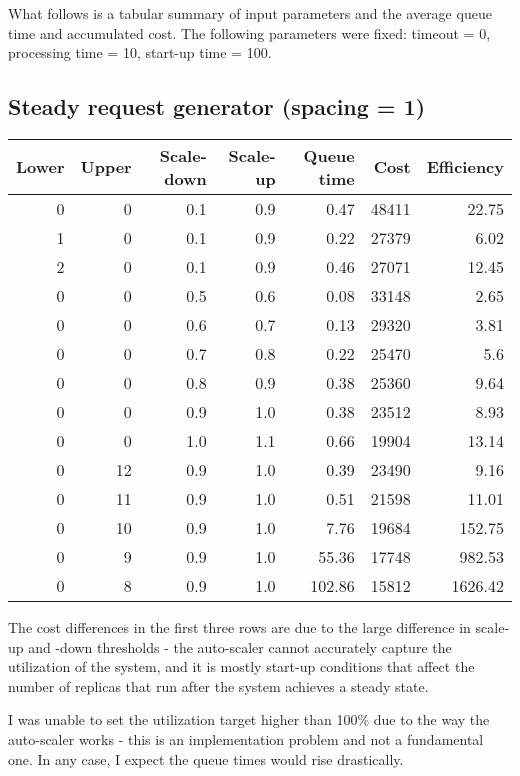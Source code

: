 \documentclass{scrartcl}
\begin{document}
What follows is a tabular summary of input parameters and the average queue time
and accumulated cost. The following parameters were fixed: timeout = 0,
processing time = 10, start-up time = 100.

\subsection{Steady request generator (spacing = 1)}
\label{sec-5-1}
\begin{center}
\begin{tabular}{rrrrrrr}
Lower & Upper & Scale-down & Scale-up & Queue time & Cost & Efficiency\\
\hline
0 & 0 & 0.1 & 0.9 & 0.47 & 48411 & 22.75\\
1 & 0 & 0.1 & 0.9 & 0.22 & 27379 & 6.02\\
2 & 0 & 0.1 & 0.9 & 0.46 & 27071 & 12.45\\
0 & 0 & 0.5 & 0.6 & 0.08 & 33148 & 2.65\\
0 & 0 & 0.6 & 0.7 & 0.13 & 29320 & 3.81\\
0 & 0 & 0.7 & 0.8 & 0.22 & 25470 & 5.6\\
0 & 0 & 0.8 & 0.9 & 0.38 & 25360 & 9.64\\
0 & 0 & 0.9 & 1.0 & 0.38 & 23512 & 8.93\\
0 & 0 & 1.0 & 1.1 & 0.66 & 19904 & 13.14\\
0 & 12 & 0.9 & 1.0 & 0.39 & 23490 & 9.16\\
0 & 11 & 0.9 & 1.0 & 0.51 & 21598 & 11.01\\
0 & 10 & 0.9 & 1.0 & 7.76 & 19684 & 152.75\\
0 & 9 & 0.9 & 1.0 & 55.36 & 17748 & 982.53\\
0 & 8 & 0.9 & 1.0 & 102.86 & 15812 & 1626.42\\
\end{tabular}
\end{center}

The cost differences in the first three rows are due to the large difference in
scale-up and -down thresholds - the auto-scaler cannot accurately capture the
utilization of the system, and it is mostly start-up conditions that affect the
number of replicas that run after the system achieves a steady state.

I was unable to set the utilization target higher than 100\% due to the way the
auto-scaler works - this is an implementation problem and not a fundamental
one. In any case, I expect the queue times would rise drastically.
\end{document}
